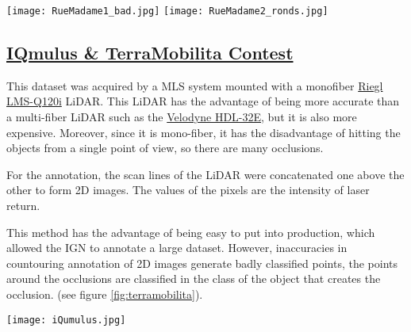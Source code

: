 \documentclass[a4paper, 10pt, journal]{article}
\begin{document}
\begin{center}\centering
 \texttt{[image: RueMadame1\_bad.jpg]}\vspace{0.1cm}
 \texttt{[image: RueMadame2\_ronds.jpg]}
\end{center}

\subsection{\href{http://data.ign.fr/benchmarks/UrbanAnalysis/}{IQmulus \& TerraMobilita Contest} \cite{vallet2015terramobilita}}\label{subsec:iqmulus}
This dataset was acquired by a MLS system mounted with a monofiber \href{http://www.riegl.com/nc/products/industrial-scanning/produktdetail/product/scanner/10/}{Riegl LMS-Q120i} LiDAR. This LiDAR has the advantage of being more accurate than a multi-fiber LiDAR such as the \href{http://velodynelidar.com/hdl-32e.html}{Velodyne HDL-32E}, but it is also more expensive. Moreover, since it is mono-fiber, it has the disadvantage of hitting the objects from a single point of view, so there are many occlusions.

For the annotation, the scan lines of the LiDAR were concatenated one above the other to form 2D images. The values of the pixels are the intensity of laser return.%

This method has the advantage of being easy to put into production, which allowed the IGN to annotate a large dataset. However, inaccuracies in countouring annotation of 2D images %
generate badly classified points, the points around the occlusions are classified in the class of the object that creates the occlusion.
(see figure \ref{fig:terramobilita}).

\begin{center}\centering
 \texttt{[image: iQumulus.jpg]}
\end{center}
\end{document}

